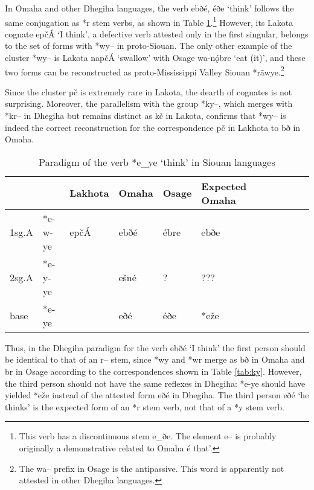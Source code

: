 \documentclass[oldfontcommands,oneside,a4paper,11pt]{article}
\newcommand{\ipa}[1]{{\phon#1}} %
\newcommand{\grise}[1]{\cellcolor{lightgray}\textbf{#1}}
\begin{document}
 In Omaha and other Dhegiha languages, the verb \ipa{ebðé}, \ipa{éðe} `think' follows the same conjugation as *\ipa{r} stem verbs, as shown in Table \ref{tab:think}.\footnote{This verb has a discontinuous stem  \ipa{e\_ðe}. The element \ipa{e--} is probably originally a demonstrative related to Omaha \ipa{é}  that'.} However, its Lakota cognate  \ipa{epčÁ} `I think', a defective verb attested only in the first singular, belongs to the set of forms with *\ipa{wy--} in proto-Siouan. The only other example of the cluster *\ipa{wy--} is Lakota \ipa{napčÁ}  `swallow'	with Osage \ipa{wa-nǫ́bre} `eat (it)', and these two forms can be reconstructed as proto-Mississippi Valley Siouan *\ipa{rãwye}.\footnote{The \ipa{wa--} prefix in Osage is the antipassive. This word is apparently not attested in other Dhegiha languages.} 
 
 Since the cluster \ipa{pč} is extremely rare in Lakota, the dearth of cognates is not surprising. Moreover, the parallelism with the group *\ipa{ky--}, which merges with *\ipa{kr--} in Dhegiha but remains distinct as \ipa{kč} in Lakota, confirms that *\ipa{wy--} is indeed the correct reconstruction for the correspondence \ipa{pč} in Lakhota to \ipa{bð} in Omaha.
 
 \begin{table}[h]
\caption{Paradigm of the verb *\ipa{e\_ye} `think' in Siouan languages}  \label{tab:think} \centering
\begin{tabular}{ll|l|ll|llll|ll}
\toprule
 &	 &	Lakhota &	 	Omaha &	Osage 	& Expected Omaha\\	
 \midrule
1sg.A &	*\ipa{e-w-ye} &	 \ipa{epčÁ} &   \ipa{ebðé} &\ipa{ébre} &\ipa{ebðe}\\
2sg.A &*\ipa{e-y-ye}&  &  \ipa{ešné} &? &???& \\
base &	*\ipa{e-ye} &	  &\ipa{eðé} &\ipa{éðe} & *\ipa{eže}\grise{}\\
\bottomrule			
\end{tabular}
\end{table} 

 Thus, in the Dhegiha paradigm for the verb \ipa{ebðé} `I think'     the first person should  be identical to that of an \ipa{r--} stem, since *\ipa{wy} and *\ipa{wr} merge as \ipa{bð} in Omaha and \ipa{br} in Osage according to the correspondences shown in Table \ref{tab:ky}. However,  the third person should not have the same reflexes in Dhegiha:  *\ipa{e-ye} should have yielded *\ipa{eže} instead of the attested form \ipa{eðé} in Dhegiha. The third person \ipa{eðé}  `he thinks' is the expected  form of an *\ipa{r} stem verb, not that of a *\ipa{y} stem verb.
 
\end{document}
